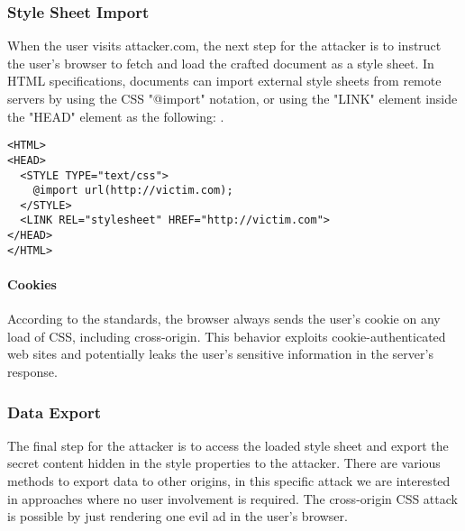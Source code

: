 \documentclass{acm_proc_article-sp}
\begin{document}
\subsubsection{Style Sheet Import}
When the user visits attacker.com, the next step for the attacker is to instruct the user's browser to fetch and load the crafted document as a style sheet. In HTML specifications\cite{html}, documents can import external style sheets from remote servers by using the CSS "@import" notation, or using the "LINK" element inside the "HEAD" element as the following: .
\begin{verbatim}
<HTML>
<HEAD>
  <STYLE TYPE="text/css">
    @import url(http://victim.com);
  </STYLE>
  <LINK REL="stylesheet" HREF="http://victim.com">
</HEAD>
</HTML>
\end{verbatim}
\paragraph{Cookies}
According to the standards, the browser always sends the user's cookie on any load of CSS, including cross-origin. This behavior exploits cookie-authenticated web sites and potentially leaks the user's sensitive information in the server's response.

\subsubsection{Data Export}
The final step for the attacker is to access the loaded style sheet and export the secret content hidden in the style properties to the attacker. There are various methods to export data to other origins, in this specific attack we are interested in approaches where no user involvement is required. The cross-origin CSS attack is possible by just rendering one evil ad in the user's browser. 
\end{document}
